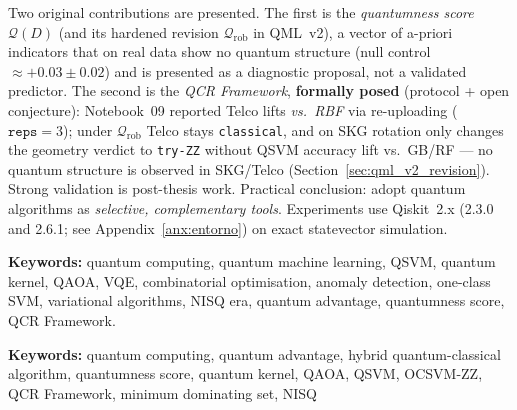 Two original contributions are presented. The first is the \emph{quantumness score} $\mathcal{Q}(D)$ (and its hardened revision $\mathcal{Q}_{\mathrm{rob}}$ in QML~v2), a vector of a-priori indicators that on real data show no quantum structure (null control $\approx+0.03\pm0.02$) and is presented as a diagnostic proposal, not a validated predictor. The second is the \emph{QCR Framework}, \textbf{formally posed} (protocol + open conjecture): Notebook~09 reported Telco lifts \emph{vs.\ RBF} via re-uploading ($\texttt{reps}=3$); under $\mathcal{Q}_{\mathrm{rob}}$ Telco stays \texttt{classical}, and on SKG rotation only changes the geometry verdict to \texttt{try-ZZ} without QSVM accuracy lift vs.\ GB/RF --- no quantum structure is observed in SKG/Telco (Section~\ref{sec:qml_v2_revision}). Strong validation is post-thesis work. Practical conclusion: adopt quantum algorithms as \emph{selective, complementary tools}. Experiments use Qiskit~2.x (2.3.0 and 2.6.1; see Appendix~\ref{anx:entorno}) on exact statevector simulation.

\vspace{0.5em}
\noindent\textbf{Keywords:} quantum computing, quantum machine learning, QSVM, quantum kernel, QAOA, VQE, combinatorial optimisation, anomaly detection, one-class SVM, variational algorithms, NISQ era, quantum advantage, quantumness score, QCR Framework.

\textbf{Keywords:} quantum computing, quantum advantage, hybrid quantum-classical algorithm, quantumness score, quantum kernel, QAOA, QSVM, OCSVM-ZZ, QCR Framework, minimum dominating set, NISQ

